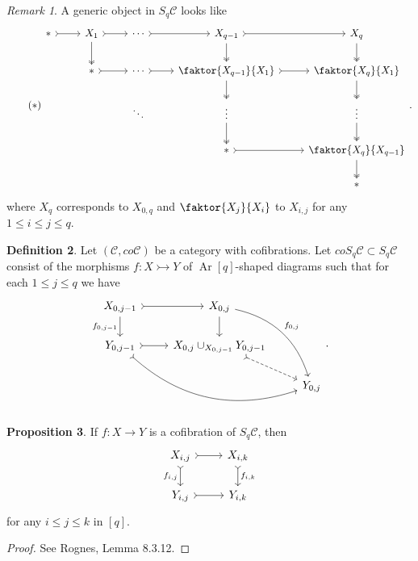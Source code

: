 \documentclass[10pt,letterpaper,cm]{nupset}
\theoremstyle{definition}
\newtheorem{definition}{Definition}
\theoremstyle{theorem}
\newtheorem{prop}[definition]{Proposition}
\theoremstyle{remark}
\newtheorem{remark}[definition]{Remark}
\newcommand{\1}{\mathbf{1}}
\renewcommand{\c}{\mathscr{C}}
\newcommand{\0}{\vec 0}
\DeclareMathOperator{\Ar}{Ar}
\begin{document}
\begin{remark}
A generic object in $S_q\c$ looks like
\[ \tag{$\ast$}
\begin{tikzcd}
\ast \arrow[r, tail] & X_1 \arrow[r, tail] \arrow[d, two heads] & \cdots \arrow[r, tail] & X_{q-1} \arrow[r, tail] \arrow[d, two heads] & X_q \arrow[d, two heads] \\
 & \ast \arrow[r, tail] & \cdots \arrow[r, tail] & \faktor{X_{q-1}}{X_1} \arrow[d, two heads] \arrow[r, tail] & \faktor{X_q}{X_1} \arrow[d, two heads] \\
 &  & \ddots & \vdots \arrow[d, two heads] & \vdots \arrow[d, two heads] \\
 &  &  & \ast \arrow[r, tail] & \faktor{X_q}{X_{q-1}} \arrow[d, two heads] \\
 &  &  &  & \ast
\end{tikzcd}.
\] where $X_q$ corresponds to $X_{0, q}$ and $\faktor{X_j}{X_i}$ to $X_{i, j}$ for any $1 \leq i \leq j \leq q$. 
\end{remark}

\begin{definition}
Let $(\c, co\c)$ be a category with cofibrations. Let $coS_q\c \subset S_q \c$ consist of the morphisms $f: X \rightarrowtail Y$ of $\Ar[q]$-shaped diagrams such that for each $1\leq j \leq q$ we have
\[
\begin{tikzcd}
{X_{0, j-1}} \arrow[d, "{f_{0, j-1}}"'] \arrow[r, tail] & {X_{0, j}} \arrow[d] \arrow[rdd, "{f_{0, j}}", bend left] &  \\
{Y_{0, j-1}} \arrow[r, tail] \arrow[rrd, tail, bend right] & {X_{0, j} \cup_{X_{0, j-1}} Y_{0, j-1}} \arrow[rd, dashed, tail] &  \\
 &  & {Y_{0, j}}
\end{tikzcd}.
\]
\end{definition}

\begin{prop}
If $f: X \to Y$ is a cofibration of $S_q\c$, then 
\[
\begin{tikzcd}
{X_{i, j}} \arrow[d, "{f_{i,j}}"', tail] \arrow[r, tail] & {X_{i, k}} \arrow[d, "{f_{i,k}}", tail] \\
{Y_{i, j}} \arrow[r, tail] & {Y_{i,k}}
\end{tikzcd}
\] for any $i \leq j \leq k$ in $[q]$.
\end{prop}
\begin{proof}
See Rognes, Lemma 8.3.12.
\end{proof}
\end{document}
